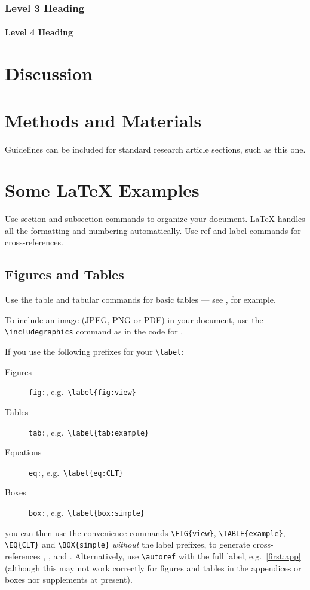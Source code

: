 \documentclass[9pt,bestpractices]{livecoms}
\begin{document}
\lipsum[3]

\subsubsection{Level 3 Heading}

\lipsum[5]

\paragraph{Level 4 Heading}
\lipsum[7]

\section{Discussion}

\lipsum[9]

\section{Methods and Materials}

Guidelines can be included for standard research article sections, such as this one.

\lipsum[3]

\section{Some \LaTeX{} Examples}
\label{sec:examples}

Use section and subsection commands to organize your document. \LaTeX{} handles all the formatting and numbering automatically. Use ref and label commands for cross-references.

\subsection{Figures and Tables}

Use the table and tabular commands for basic tables --- see , for example.

To include an image (JPEG, PNG or PDF) in your document, use the \verb|\includegraphics| command as in the code for .

If you use the following prefixes for your \verb|\label|:
%
\begin{description}
\item[Figures] \texttt{fig:}, e.g.~\verb|\label{fig:view}|
\item[Tables] \texttt{tab:}, e.g.~\verb|\label{tab:example}|
\item[Equations] \texttt{eq:}, e.g.~\verb|\label{eq:CLT}|
\item[Boxes] \texttt{box:}, e.g.~\verb|\label{box:simple}|
\end{description}
%
you can then use the convenience commands \verb|\FIG{view}|, \verb|\TABLE{example}|, \verb|\EQ{CLT}| and \verb|\BOX{simple}| \emph{without} the label prefixes, to generate cross-references , ,  and . Alternatively, use \verb|\autoref| with the full label, e.g.~\autoref{first:app} (although this may not work correctly for figures and tables in the appendices or boxes nor supplements at present).
\end{document}

